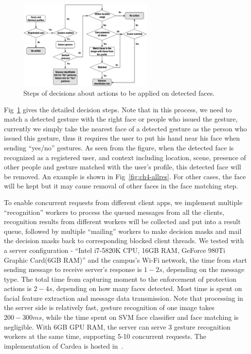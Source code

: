 \begin{description}[leftmargin=0cm]
\begin{figure}[!htbp]
    \centering
    \includegraphics[width=0.6\textwidth]{figure/ch4-decisiontree.pdf}
    \caption{Steps of decisions about actions to be applied on detected faces.}
    \label{fig:ch4-decisiontree}
\end{figure}

  \item[{Decision making:}] Fig~\ref{fig:ch4-decisiontree} gives the detailed decision steps. Note that in this process, we need to match a detected gesture with the right face or people who issued the gesture, currently we simply take the nearest face of a detected gesture as the person who issued this gesture, thus it requires the user to put his hand near his face when sending ``yes/no'' gestures. As seen from the figure, when the detected face is recognized as a registered user, and context including location, scene, presence of other people and gesture matched with the user's profile, this detected face will be removed. An example is shown in Fig~\ref{fig:ch4-allres}. For other cases, the face will be kept but it may cause removal of other faces in the face matching step.


  \item[{Concurrent requests:}] To enable concurrent requests from different client apps, we implement multiple ``recognition'' workers to process the queued messages from all the clients, recognition results from different workers will be collected and put into a result queue, followed by multiple ``mailing'' workers to make decision masks and mail the decision masks back to corresponding blocked client threads. We tested with a server configuration - ``Intel i7-5820K CPU, 16GB RAM, GeForce 980Ti Graphic Card(6GB RAM)'' and the campus's Wi-Fi network, the time from start sending message to receive server's response is $1-2s$, depending on the message type. The total time from capturing moment to the enforcement of protection actions is $2-4s$, depending on how many faces detected. Most time is spent on facial feature extraction and message data transmission. Note that processing in the server side is relatively fast, gesture recognition of one image takes $200-300ms$, while the time spent on SVM face classifier and face matching is negligible. With 6GB GPU RAM, the server can serve 3 gesture recognition workers at the same time, supporting 5-10 concurrent requests. The implementation of Cardea is hosted in~\cite{links:cardeaproj}.

\end{description}


